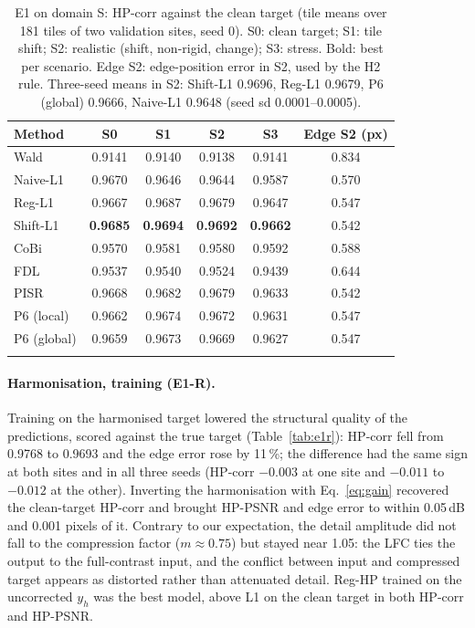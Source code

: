 \documentclass[pdflatex,sn-basic,referee,lineno]{sn-jnl}
\begin{document}
\begin{table}[t]
\caption{E1 on domain S: HP-corr against the clean target (tile means over 181 tiles of two validation sites,
seed 0). S0: clean target; S1: tile shift; S2: realistic (shift, non-rigid, change); S3: stress. Bold: best per
scenario. Edge S2: edge-position error in S2, used by the H2 rule. Three-seed means in S2: Shift-L1 0.9696, Reg-L1 0.9679, P6 (global) 0.9666, Naive-L1 0.9648 (seed sd
0.0001--0.0005).}\label{tab:e1}
\begin{tabular*}{\textwidth}{@{\extracolsep\fill}lccccc}
\toprule
Method & S0 & S1 & S2 & S3 & Edge S2 (px) \\
\midrule
Wald & 0.9141 & 0.9140 & 0.9138 & 0.9141 & 0.834 \\
Naive-L1 & 0.9670 & 0.9646 & 0.9644 & 0.9587 & 0.570 \\
Reg-L1 & 0.9667 & 0.9687 & 0.9679 & 0.9647 & 0.547 \\
Shift-L1 & \textbf{0.9685} & \textbf{0.9694} & \textbf{0.9692} & \textbf{0.9662} & 0.542 \\
CoBi & 0.9570 & 0.9581 & 0.9580 & 0.9592 & 0.588 \\
FDL & 0.9537 & 0.9540 & 0.9524 & 0.9439 & 0.644 \\
PISR & 0.9668 & 0.9682 & 0.9679 & 0.9633 & 0.542 \\
P6 (local) & 0.9662 & 0.9674 & 0.9672 & 0.9631 & 0.547 \\
P6 (global) & 0.9659 & 0.9673 & 0.9669 & 0.9627 & 0.547 \\
\botrule
\end{tabular*}
\end{table}

\paragraph{Harmonisation, training (E1-R).} Training on the harmonised target lowered the structural quality of the
predictions, scored against the true target (Table~\ref{tab:e1r}): HP-corr fell from 0.9768 to 0.9693 and the edge
error rose by 11\,\%; the difference had the same sign at both sites and in all three seeds (HP-corr $-0.003$ at
one site and $-0.011$ to $-0.012$ at the other). Inverting the harmonisation with
Eq.~\eqref{eq:gain} recovered the clean-target HP-corr and brought HP-PSNR and edge error to within 0.05\,dB and
0.001 pixels of it. Contrary to our expectation, the detail amplitude did not fall to the compression factor
($m\approx0.75$) but stayed near 1.05: the LFC ties the output to the full-contrast input, and the conflict between
input and compressed target appears as distorted rather than attenuated detail. Reg-HP trained on the uncorrected
$y_h$ was the best model, above L1 on the clean target in both HP-corr and HP-PSNR.
\end{document}
